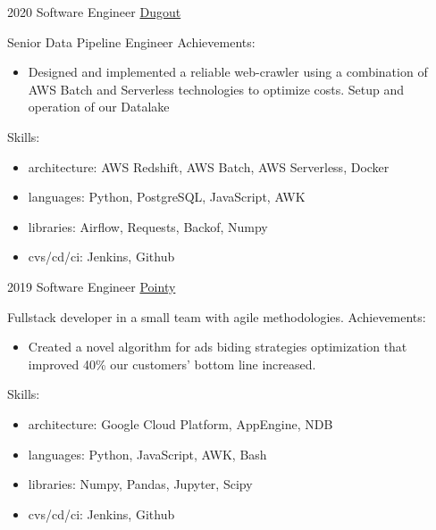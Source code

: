 \documentclass[11pt,a4paper]{moderncv}
\begin{document}
    \cventry
        {2020}
        {Software Engineer}
        {\href{https://www.dugout.com}{Dugout}} {} {}
        {
            Senior Data Pipeline Engineer
            Achievements:
            \begin{itemize}
                \item Designed and implemented a reliable web-crawler
                      using a combination of AWS Batch and Serverless
                      technologies to optimize costs.
                      Setup and operation of our Datalake
            \end{itemize}
            Skills:
            \begin{itemize}
                \item architecture: AWS Redshift, AWS Batch, AWS Serverless, Docker
                \item languages: Python, PostgreSQL, JavaScript, AWK
                \item libraries: Airflow, Requests, Backof, Numpy
                \item cvs/cd/ci: Jenkins, Github
            \end{itemize}
        }

    \cventry
        {2019}
        {Software Engineer}
        {\href{https://www.pointy.com}{Pointy}} {} {}
        {
            Fullstack developer in a small team with agile methodologies.
            Achievements:
            \begin{itemize}
                \item Created a novel algorithm for ads biding strategies
                      optimization that improved 40\% our customers'
                      bottom line increased.
            \end{itemize}
            Skills:
            \begin{itemize}
                \item architecture: Google Cloud Platform, AppEngine, NDB
                \item languages: Python, JavaScript, AWK, Bash
                \item libraries: Numpy, Pandas, Jupyter, Scipy
                \item cvs/cd/ci: Jenkins, Github
            \end{itemize}
        }
\end{document}
